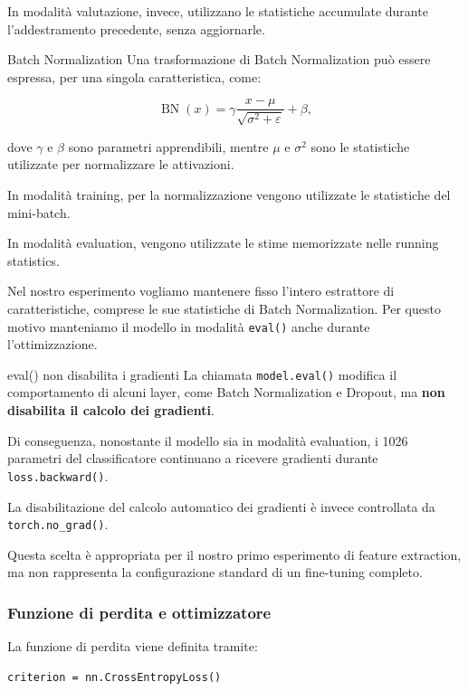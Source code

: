 \documentclass[10pt,a4paper,oneside]{book}
\begin{document}
In modalità valutazione, invece, utilizzano
le statistiche accumulate durante l'addestramento
precedente, senza aggiornarle.

\begin{definitionbox}{Batch Normalization}
Una trasformazione di Batch Normalization può essere
espressa, per una singola caratteristica, come:

\[
\operatorname{BN}(x)
=
\gamma
\frac{x-\mu}{\sqrt{\sigma^2+\varepsilon}}
+\beta,
\]

dove $\gamma$ e $\beta$ sono parametri
apprendibili, mentre $\mu$ e $\sigma^2$
sono le statistiche utilizzate per normalizzare
le attivazioni.

In modalità training, per la normalizzazione
vengono utilizzate le statistiche del mini-batch.

In modalità evaluation, vengono utilizzate
le stime memorizzate nelle running statistics.
\end{definitionbox}

Nel nostro esperimento vogliamo mantenere fisso
l'intero estrattore di caratteristiche, comprese
le sue statistiche di Batch Normalization.
Per questo motivo manteniamo il modello in modalità
\texttt{eval()} anche durante l'ottimizzazione.

\begin{warningbox}{eval() non disabilita i gradienti}
La chiamata \texttt{model.eval()} modifica il
comportamento di alcuni layer, come Batch Normalization
e Dropout, ma \textbf{non disabilita il calcolo dei gradienti}.

Di conseguenza, nonostante il modello sia in modalità
evaluation, i 1026 parametri del classificatore
continuano a ricevere gradienti durante
\texttt{loss.backward()}.

La disabilitazione del calcolo automatico dei gradienti
è invece controllata da \texttt{torch.no\_grad()}.

Questa scelta è appropriata per il nostro primo
esperimento di feature extraction, ma non rappresenta
la configurazione standard di un fine-tuning completo.
\end{warningbox}

\subsubsection{Funzione di perdita e ottimizzatore}

La funzione di perdita viene definita tramite:

\begin{verbatim}
criterion = nn.CrossEntropyLoss()
\end{verbatim}
\end{document}
